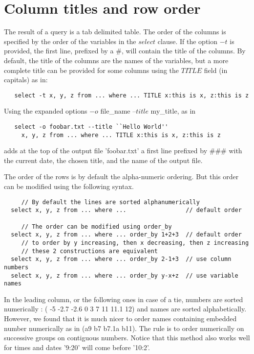 \documentclass[11pt]{article}
\newcommand{\BL}{\begin{lstlisting}}
\begin{document}
\section{Column titles and row order}

The result of a query is a tab delimited table. 
The order of the columns is specified by the order of the variables in the $select$ clause.
If the option $-$$t$ is provided, the first line, prefixed by a \#, will contain the title of the columns.
By default, the title of the columns are the names of the variables, but a more 
complete title can be provided for some columns using the $TITLE$ field (in capitals)  as in:
\BL
   select -t x, y, z from ... where ... TITLE x:this is x, z:this is z
\end{lstlisting}
Using the expanded options $-o$ file\_name --$title$ my\_title, as in 
\BL
   select -o foobar.txt --title ``Hello World''
     x, y, z from ... where ... TITLE x:this is x, z:this is z
\end{lstlisting}
adds at the top of the output file 'foobar.txt'
a first line prefixed by $\#\#\#$ with the current date, the chosen title, and the name of the output file.

The order of the rows is by default the alpha-numeric ordering.
But this order can be modified using the following syntax.

\BL
     // By default the lines are sorted alphanumerically
  select x, y, z from ... where ...                 // default order

     // The order can be modified using order_by
  select x, y, z from ... where ... order_by 1+2+3  // default order
     // to order by y increasing, then x decreasing, then z increasing
     // these 2 constructions are equivalent
  select x, y, z from ... where ... order_by 2-1+3  // use column numbers
  select x, y, z from ... where ... order_by y-x+z  // use variable names
\end{lstlisting}
In the leading column, or the following ones in case of a tie,
numbers are sorted numerically : ( -5 -2.7 -2.6 0 3 7 11 11.1 12) 
and names are sorted alphabetically. However, we found\cite {DTM94} that it is much nicer to
order names containing embedded number numerically as in (a9 b7 b7.1a b11). 
The rule is to order numerically on successive groups on contiguous numbers.
Notice that this method also works well for times and dates
'9:20' will come before '10:2'.

\end{document}
